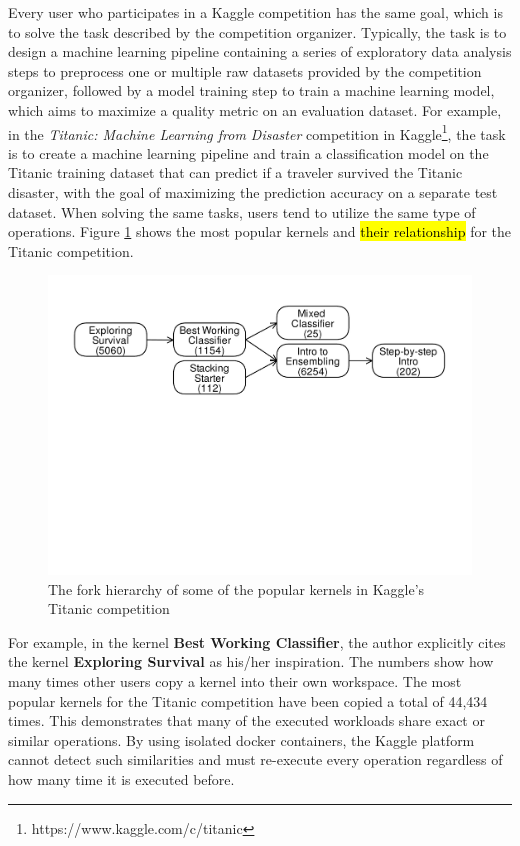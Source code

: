 Every user who participates in a Kaggle competition has the same goal, which is to solve the task described by the competition organizer.
Typically, the task is to design a machine learning pipeline containing a series of exploratory data analysis steps to preprocess one or multiple raw datasets provided by the competition organizer, followed by a model training step to train a machine learning model, which aims to maximize a quality metric on an evaluation dataset.
For example, in the \textit{Titanic: Machine Learning from Disaster} competition in Kaggle\footnote{https://www.kaggle.com/c/titanic}, the task is to create a machine learning pipeline and train a classification model on the Titanic training dataset that can predict if a traveler survived the Titanic disaster, with the goal of maximizing the prediction accuracy on a separate test dataset.
When solving the same tasks, users tend to utilize the same type of operations.
Figure \ref{fig-titanic-script-hierarchy} shows the most popular kernels and \hl{their relationship} for the Titanic competition.
\begin{figure}
\centering
\includegraphics[width=\columnwidth]{../images/kaggle-titanic-scripts-graph}
\caption{The fork hierarchy of some of the popular kernels in Kaggle's Titanic competition}
\label{fig-titanic-script-hierarchy}
\end{figure}
For example, in the kernel \textbf{Best Working Classifier}, the author explicitly cites the kernel \textbf{Exploring Survival} as his/her inspiration.
The numbers show how many times other users copy a kernel into their own workspace.
The most popular kernels for the Titanic competition have been copied a total of 44,434 times.
This demonstrates that many of the executed workloads share exact or similar operations.
By using isolated docker containers, the Kaggle platform cannot detect such similarities and must re-execute every operation regardless of how many time it is executed before.

